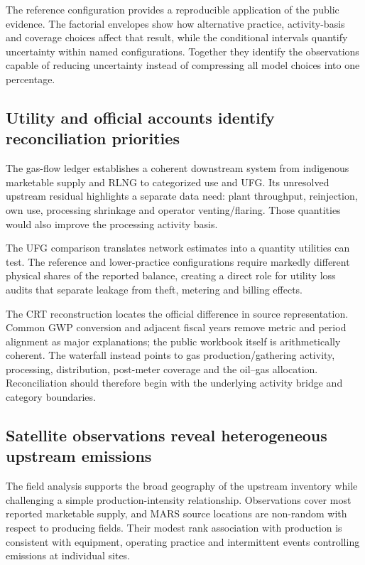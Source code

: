 The reference configuration provides a reproducible application of the public evidence. The
factorial envelopes show how alternative practice, activity-basis and coverage choices affect
that result, while the conditional intervals quantify uncertainty within named configurations.
Together they identify the observations capable of reducing uncertainty instead of compressing
all model choices into one percentage.

\subsection{Utility and official accounts identify reconciliation priorities}

The gas-flow ledger establishes a coherent downstream system from indigenous marketable supply
and RLNG to categorized use and UFG. Its unresolved upstream residual highlights a separate data
need: plant throughput, reinjection, own use, processing shrinkage and operator venting/flaring.
Those quantities would also improve the processing activity basis.

The UFG comparison translates network estimates into a quantity utilities can test. The
reference and lower-practice configurations require markedly different physical shares of the
reported balance, creating a direct role for utility loss audits that separate leakage from
theft, metering and billing effects.

The CRT reconstruction locates the official difference in source representation. Common GWP
conversion and adjacent fiscal years remove metric and period alignment as major explanations;
the public workbook itself is arithmetically coherent. The waterfall instead points to gas
production/gathering activity, processing, distribution, post-meter coverage and the oil--gas
allocation. Reconciliation should therefore begin with the underlying activity bridge and
category boundaries.

\subsection{Satellite observations reveal heterogeneous upstream emissions}

The field analysis supports the broad geography of the upstream inventory while challenging a
simple production-intensity relationship. Observations cover most reported marketable supply,
and MARS source locations are non-random with respect to producing fields. Their modest rank
association with production is consistent with equipment, operating practice and intermittent
events controlling emissions at individual sites.

